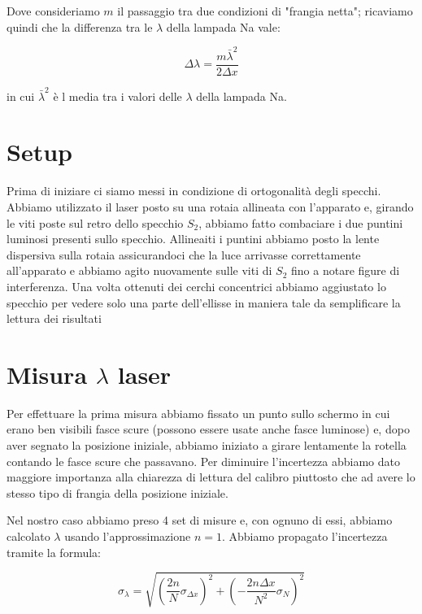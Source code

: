 \documentclass{article}
\begin{document}
Dove consideriamo $m$ il passaggio tra due condizioni di "frangia netta"; ricaviamo quindi che la differenza tra le $\lambda$ della lampada Na vale:

\begin{equation} 
\Delta{\lambda} = \frac{m \bar \lambda^2}{2 \Delta{x}} 
\end{equation}

in cui $ \bar \lambda^2$ è l media tra i valori delle $\lambda$ della lampada Na.




\section{Setup}
Prima di iniziare ci siamo messi in condizione di ortogonalità degli specchi. Abbiamo utilizzato il laser posto su una rotaia allineata con l'apparato e, girando le viti poste sul retro dello specchio $S_2$, abbiamo fatto combaciare i due puntini luminosi presenti sullo specchio. Allineaiti i puntini abbiamo posto la lente dispersiva sulla rotaia assicurandoci che la luce arrivasse correttamente all'apparato e abbiamo agito nuovamente sulle viti di $S_2$ fino a notare figure di interferenza. Una volta ottenuti dei cerchi concentrici abbiamo aggiustato lo specchio per vedere solo una parte dell'ellisse in maniera tale da semplificare la lettura dei risultati




\section{Misura $\lambda$ laser}
Per effettuare la prima misura abbiamo fissato un punto sullo schermo in cui erano ben visibili fasce scure (possono essere usate anche fasce luminose) e, dopo aver segnato la posizione iniziale, abbiamo iniziato a girare lentamente la rotella contando le fasce scure che passavano. Per diminuire l'incertezza abbiamo dato maggiore importanza alla chiarezza di lettura del calibro piuttosto che ad avere lo stesso tipo di frangia della posizione iniziale.

Nel nostro caso abbiamo preso 4 set di misure e, con ognuno di essi, abbiamo calcolato $\lambda$ usando l'approssimazione $n = 1$. Abbiamo propagato l'incertezza tramite la formula:

\begin{equation} 
\sigma_\lambda= \sqrt{(\frac{2 n}{N} \sigma_{\Delta x})^2 + ({-} \frac{2 n \Delta x}{N^2} \sigma_N)^2}
\end{equation}
\end{document}
